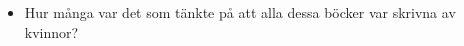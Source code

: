 \begin{frame}
  \begin{question}
    \begin{itemize}
      \item Hur många var det som tänkte på att alla dessa böcker var skrivna 
        av kvinnor?
    \end{itemize}
  \end{question}
\end{frame}







